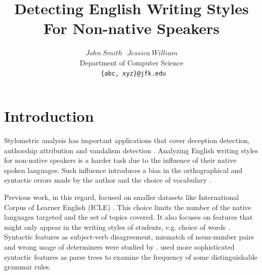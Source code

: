 \documentclass[10pt,a5paper,twoside]{article}
\title{Detecting English Writing Styles For Non-native Speakers}
\author{$John ~ Smith ~~~ Jessica ~ William$ \\
  Department of Computer Science \\
  \texttt{ \{abc, xyz\}@jfk.edu}}
\begin{document}
\maketitle
{}


\newpage

\section{Introduction}
Stylometric analysis has important applications that cover deception detection,
authorship attribution and vandalism detection \cite{Harpalani, Ott}.
Analyzing English writing styles for non-native speakers is a harder task due to the
influence of their native spoken languages.
Such influence introduces a bias in the orthographical and syntactic errors made by the author and the choice of vocabulary \cite{koppel2005automatically}.

Previous work, in this regard, focused on smaller datasets like {International Corpus of Learner English} (ICLE) \cite{koppel2005automatically, koppel2005determining, argamon2009automatically}. This choice limits the number of the native languages targeted and the set of topics covered.
It also focuses on features that might only appear in the writing styles of
students, e.g. choice of words \cite{tsur2007using, zheng2003authorship,
gamon2004linguistic}. Syntactic features as subject-verb disagreement, mismatch
of noun-number pairs and wrong usage of determiners were studied by
\cite{wong2009contrastive}.
\cite{wong2010parser, wongdras2011EMNLP} used more sophisticated syntactic features as parse trees
to examine the frequency of some distinguishable grammar rules.
\end{document}
